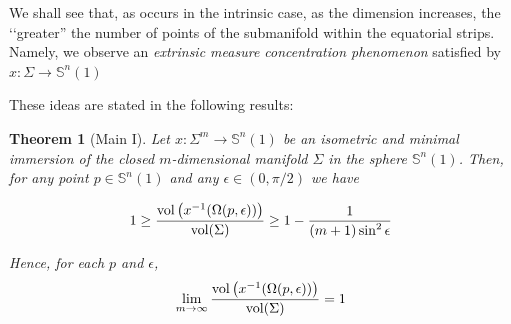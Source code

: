 \documentclass{amsart}
\newtheorem{theorem}{Theorem}[section]
\theoremstyle{definition}
\theoremstyle{remark}
\begin{document}
We shall see that, as occurs in the intrinsic case, as the dimension increases, the \lq\lq greater'' the number of points of the submanifold within the equatorial strips. Namely, we observe an \emph{ extrinsic measure concentration phenomenon} satisfied by $x: \Sigma\to \mathbb{S}^n(1)$

These ideas are stated in the following results:

\begin{theorem}[Main I]\label{extrinsicconc1}
Let  $x: \Sigma^m \to \mathbb{S}^n(1)$ be an isometric and minimal immersion of the closed $m$-dimensional manifold $\Sigma$ in the sphere  $\mathbb{S}^n(1)$. Then, for any point $p \in \mathbb{S}^n(1)$ and any  $\epsilon \in (0,\pi/2)$ we have 

$$
 1 \geq \frac{{\rm vol}\left(x^{-1}(\Omega(p,\epsilon))\right)}{{\rm vol}(\Sigma)}\geq1-\frac{1}{(m+1)\sin^2\epsilon}
$$

\noindent Hence, for each $p$ and $\epsilon$,
$$
\lim_{m\to\infty}\frac{{\rm vol}\left(x^{-1}(\Omega(p,\epsilon))\right)}{{\rm vol}(\Sigma)}=1
$$
\end{theorem}
\end{document}

